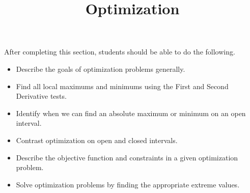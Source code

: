 \documentclass{ximera}
\title{Optimization}
\begin{document}
\begin{abstract}
\end{abstract}

\maketitle

\begin{sectionOutcomes}

After completing this section, students should be able to do the following.

\begin{itemize}
\item Describe the goals of optimization problems generally.
\item Find all local maximums and minimums using the First and Second Derivative tests.
\item Identify when we can find an absolute maximum or minimum on an open interval.
\item Contrast optimization on open and closed intervals.
\item Describe the objective function and constraints in a given optimization problem.
\item Solve optimization problems by finding the appropriate extreme values.
\end{itemize}

\end{sectionOutcomes}
\end{document}
